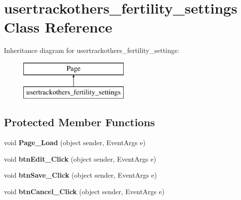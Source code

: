 \hypertarget{classusertrackothers__fertility__settings}{\section{usertrackothers\-\_\-fertility\-\_\-settings Class Reference}
\label{classusertrackothers__fertility__settings}
}
Inheritance diagram for usertrackothers\-\_\-fertility\-\_\-settings\-:\begin{figure}[H]
\begin{center}
\leavevmode
\includegraphics[height=2.000000cm]{classusertrackothers__fertility__settings}
\end{center}
\end{figure}
\subsection*{Protected Member Functions}
\begin{DoxyCompactItemize}
\item 
\hypertarget{classusertrackothers__fertility__settings_ad29377e9102b2a6d32cb3c5879be75cb}{void {\bfseries Page\-\_\-\-Load} (object sender, Event\-Args e)}\label{classusertrackothers__fertility__settings_ad29377e9102b2a6d32cb3c5879be75cb}

\item 
\hypertarget{classusertrackothers__fertility__settings_a16bc47a5dd18e40985baaa637c3d3e89}{void {\bfseries btn\-Edit\-\_\-\-Click} (object sender, Event\-Args e)}\label{classusertrackothers__fertility__settings_a16bc47a5dd18e40985baaa637c3d3e89}

\item 
\hypertarget{classusertrackothers__fertility__settings_a27a0bfe39b287e7ba96cb37644a79f30}{void {\bfseries btn\-Save\-\_\-\-Click} (object sender, Event\-Args e)}\label{classusertrackothers__fertility__settings_a27a0bfe39b287e7ba96cb37644a79f30}

\item 
\hypertarget{classusertrackothers__fertility__settings_a93858a180a0ea5631a7ea4b7aaa751aa}{void {\bfseries btn\-Cancel\-\_\-\-Click} (object sender, Event\-Args e)}\label{classusertrackothers__fertility__settings_a93858a180a0ea5631a7ea4b7aaa751aa}

\end{DoxyCompactItemize}



